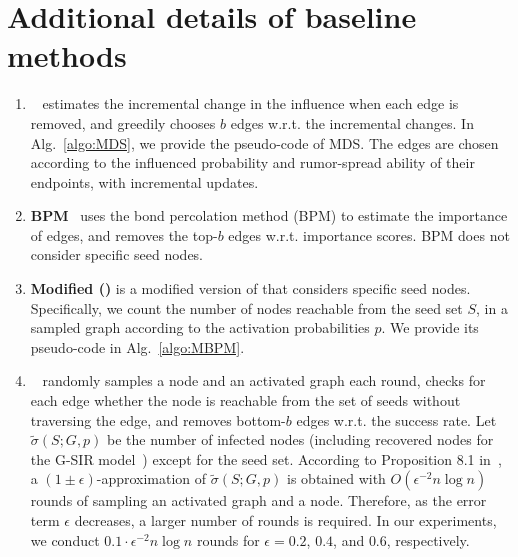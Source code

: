 \section{Additional details of baseline methods}\label{sec:app_base}
\begin{enumerate}[leftmargin=*,topsep=0pt,itemsep=0pt]
    \item \textbf{\MDS}~\cite{yan2019rumor} estimates the incremental change in the influence when each edge is removed, and greedily chooses $b$ edges w.r.t. the incremental changes. In Alg.~\ref{algo:MDS}, we provide the pseudo-code of MDS. 
    The edges are chosen according to the influenced probability and rumor-spread ability of their endpoints, with incremental updates. 
    \item \textbf{BPM}~\cite{Kimura2009blocking} uses the bond percolation method (BPM) to estimate the importance of edges, and removes the top-$b$ edges w.r.t. importance scores. BPM does not consider specific seed nodes.
    \item \textbf{Modified \BPM (\MBPM)} is a modified version of \BPM that considers specific seed nodes.
    Specifically, we count the number of nodes reachable from the seed set $S$, in a sampled graph according to the activation probabilities $p$. We provide its pseudo-code in Alg.~\ref{algo:MBPM}.
    \item \textbf{\RIS}~\cite{yi2022edge} randomly samples a node and an activated graph each round, checks for each edge whether the node is reachable from the set of seeds without traversing the edge, and removes bottom-$b$ edges w.r.t. the success rate. Let $\tilde{\sigma}(S; G, p)$ be the number of infected nodes (including recovered nodes for the G-SIR model~\cite{yi2022edge}) except for the seed set. 
    According to Proposition 8.1 in~\cite{yi2022edge}, a $(1\pm \epsilon)$-approximation of $\tilde{\sigma}(S; G, p)$ is obtained with $O(\epsilon^{-2}n\log n)$ rounds of sampling an activated graph and a node. Therefore, as the error term $\epsilon$ decreases, a larger number of rounds is required.
    In our experiments, we conduct $0.1\cdot\epsilon^{-2}n\log n$ rounds for $\epsilon=0.2$, $0.4$, and $0.6$, respectively.
\end{enumerate}


